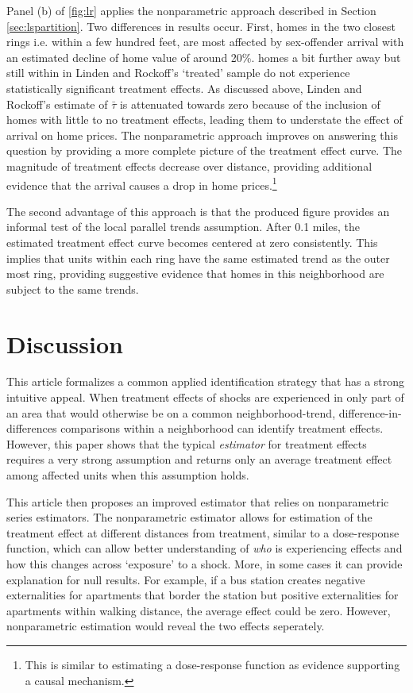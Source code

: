 \documentclass[10pt]{article}
\begin{document}
Panel (b) of \autoref{fig:lr} applies the nonparametric approach described in Section \ref{sec:lspartition}. Two differences in results occur. First, homes in the two closest rings i.e. within a few hundred feet, are most affected by sex-offender arrival with an estimated decline of home value of around 20\%. homes a bit further away but still within in Linden and Rockoff's `treated' sample do not experience statistically significant treatment effects. As discussed above, Linden and Rockoff's estimate of $\bar{\tau}$ is attenuated towards zero because of the inclusion of homes with little to no treatment effects, leading them to understate the effect of arrival on home prices. The nonparametric approach improves on answering this question by providing a more complete picture of the treatment effect curve. The magnitude of treatment effects decrease over distance, providing additional evidence that the arrival causes a drop in home prices.\footnote{This is similar to estimating a dose-response function as evidence supporting a causal mechanism.} 

The second advantage of this approach is that the produced figure provides an informal test of the local parallel trends assumption. After 0.1 miles, the estimated treatment effect curve becomes centered at zero consistently. This implies that units within each ring have the same estimated trend as the outer most ring, providing suggestive evidence that homes in this neighborhood are subject to the same trends. 



\section{Discussion}

This article formalizes a common applied identification strategy that has a strong intuitive appeal. When treatment effects of shocks are experienced in only part of an area that would otherwise be on a common neighborhood-trend, difference-in-differences comparisons within a neighborhood can identify treatment effects. However, this paper shows that the typical \emph{estimator} for treatment effects requires a very strong assumption and returns only an average treatment effect among affected units when this assumption holds. 

This article then proposes an improved estimator that relies on nonparametric series estimators. The nonparametric estimator allows for estimation of the treatment effect at different distances from treatment, similar to a dose-response function, which can allow better understanding of \emph{who} is experiencing effects and how this changes across `exposure' to a shock. More, in some cases it can provide explanation for null results. For example, if a bus station creates negative externalities for apartments that border the station but positive externalities for apartments within walking distance, the average effect could be zero. However, nonparametric estimation would reveal the two effects seperately.
\end{document}
